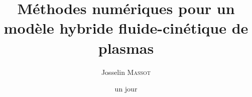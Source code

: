 





\author{Josselin \textsc{Massot}}

\title{Méthodes numériques pour un modèle hybride fluide-cinétique de plasmas}
\lesoustitre{}

\def\thetitleEN{Numerical methods for fluid-kinetic hybrid model of plasmas}

\date{un jour}


\numthese{} %

